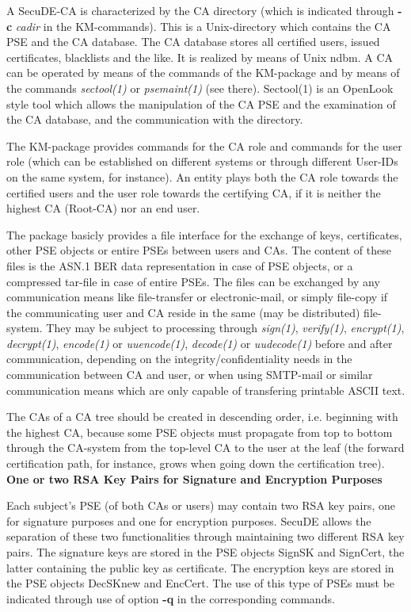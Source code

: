 A  SecuDE-CA is characterized by the CA directory (which is indicated through {\bf -c} {\em cadir} 
in the KM-commands).
This is a Unix-directory which contains the CA PSE and the CA database. The CA database
stores all certified users, issued certificates, blacklists and the like. It is realized by means of 
Unix ndbm. A CA can be operated by means of the commands of the KM-package and by means of the 
commands {\em sectool(1)} or {\em psemaint(1)} (see there). Sectool(1) is an OpenLook style 
tool which allows the manipulation of the CA PSE and the examination of the CA database, and 
the communication with the directory.

The KM-package provides commands for the CA role and commands for the user role (which can be 
established 
on different systems or through different User-IDs on the same system, for instance). 
An entity plays both the CA role towards the certified users and the user role towards the certifying
CA, if it is neither the highest CA (Root-CA) nor an end user.

The package basicly provides a file interface for the exchange of keys, certificates, other
PSE objects or entire PSEs between users and CAs. The content of these files is the ASN.1 BER data 
representation in case of PSE objects, or a compressed tar-file in case of entire PSEs. The files
can be exchanged by any communication means like file-transfer or electronic-mail, or                
simply file-copy if the communicating user and CA reside in the same (may be distributed)
file-system. They may be subject to processing through {\em sign(1)}, {\em verify(1)}, {\em encrypt(1)},
{\em decrypt(1)}, {\em encode(1)} or {\em uuencode(1)}, {\em decode(1)} or {\em uudecode(1)}
before and after communication, depending on the integrity/confidentiality needs in the
communication between CA and user, or when using SMTP-mail or similar communication means 
which are only capable of transfering printable ASCII text.

The CAs of a CA tree should be created in descending order, i.e. beginning with
the highest CA, because some PSE objects must propagate from top to bottom through the CA-system 
from the top-level CA to the user at the leaf (the forward certification path, for
instance, grows when going down the certification tree).
\\ [1em]
{\bf One or two RSA Key Pairs for Signature and Encryption Purposes}

Each subject's PSE (of both CAs or users) may contain two RSA key pairs, one for signature
purposes and one for encryption purposes. SecuDE allows the separation of these two
functionalities through maintaining two different RSA key pairs.
The signature keys are stored in the PSE objects
SignSK and SignCert, the latter containing the public key as certificate. The encryption
keys are stored in the PSE objects DecSKnew and EncCert. The use of this type of PSEs
must be indicated through use of option {\bf -q} in the corresponding commands.

